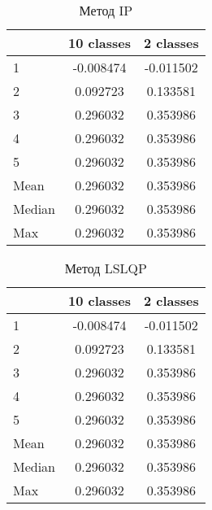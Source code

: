 \documentclass[12pt,a4paper]{article}
\begin{document}
\begin{table}[H]
    \centering
    \begin{tabular}{|l||c|c|}
        \hline
        & 10 classes & 2 classes \\\hline\hline
        1 & -0.008474 & -0.011502 \\\hline
        2 & 0.092723 & 0.133581 \\\hline
        3 & 0.296032 & 0.353986 \\\hline
        4 & 0.296032 & 0.353986 \\\hline
        5 & 0.296032 & 0.353986 \\\hline
        Mean & 0.296032 & 0.353986 \\\hline
        Median & 0.296032 & 0.353986 \\\hline
        Max & 0.296032 & 0.353986 \\\hline
    \end{tabular}
    \caption{Метод IP}
\end{table}

\begin{table}[H]
    \centering
    \begin{tabular}{|l||c|c|}
        \hline
        & 10 classes & 2 classes \\\hline\hline
        1 & -0.008474 & -0.011502 \\\hline
        2 & 0.092723 & 0.133581 \\\hline
        3 & 0.296032 & 0.353986 \\\hline
        4 & 0.296032 & 0.353986 \\\hline
        5 & 0.296032 & 0.353986 \\\hline
        Mean & 0.296032 & 0.353986 \\\hline
        Median & 0.296032 & 0.353986 \\\hline
        Max & 0.296032 & 0.353986 \\\hline
    \end{tabular}
    \caption{Метод LSLQP}
\end{table}
\end{document}
